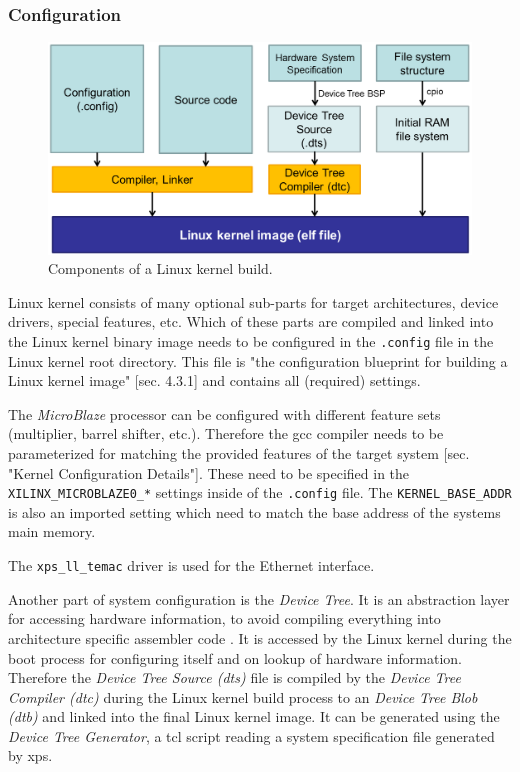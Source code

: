 \subsubsection{Configuration}

\begin{figure}
	\centering
	\includegraphics[width=.6\textwidth]{linux-config-build.png}
	\caption{Components of a Linux kernel build.}
\end{figure}

Linux kernel consists of many optional sub-parts for target architectures, device drivers, special features, etc. Which of these parts are compiled and linked into the Linux kernel binary image needs to be configured in the \texttt{.config} file in the Linux kernel root directory. This file is "the configuration blueprint for building a Linux kernel image" \cite{linuxPrimer}[sec. 4.3.1] and contains all (required) settings.

The \textit{MicroBlaze} processor can be configured with different feature sets (multiplier, barrel shifter, etc.). Therefore the \gls{gcc} compiler needs to be parameterized for matching the provided features of the target system \cite{mb_linux}[sec. "Kernel Configuration Details"]. These need to be specified in the \texttt{XILINX\_MICROBLAZE0\_*} settings inside of the \texttt{.config} file. The \texttt{KERNEL\_BASE\_ADDR} is also an imported setting which need to match the base address of the systems main memory.

The \texttt{xps\_ll\_temac} driver is used for the Ethernet interface.

Another part of system configuration is the \textit{Device Tree}. It is an abstraction layer for accessing hardware information, to avoid compiling everything into architecture specific assembler code \cite{device_tree}. It is accessed by the Linux kernel during the boot process for configuring itself and on lookup of hardware information. Therefore the \textit{Device Tree Source (dts)} file is compiled by the \textit{Device Tree Compiler (dtc)} during the Linux kernel build process to an \textit{Device Tree Blob (dtb)} and linked into the final Linux kernel image. It can be generated using the \textit{Device Tree Generator}, a \gls{tcl} script reading a system specification file generated by \gls{xps}.

